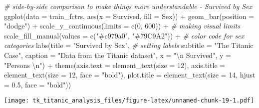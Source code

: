 \documentclass[
]{article}
\newenvironment{Shaded}{\begin{snugshade}}{\end{snugshade}}
\newcommand{\AttributeTok}[1]{\textcolor[rgb]{0.77,0.63,0.00}{#1}}
\newcommand{\CommentTok}[1]{\textcolor[rgb]{0.56,0.35,0.01}{\textit{#1}}}
\newcommand{\DecValTok}[1]{\textcolor[rgb]{0.00,0.00,0.81}{#1}}
\newcommand{\FloatTok}[1]{\textcolor[rgb]{0.00,0.00,0.81}{#1}}
\newcommand{\FunctionTok}[1]{\textcolor[rgb]{0.00,0.00,0.00}{#1}}
\newcommand{\NormalTok}[1]{#1}
\newcommand{\SpecialCharTok}[1]{\textcolor[rgb]{0.00,0.00,0.00}{#1}}
\newcommand{\StringTok}[1]{\textcolor[rgb]{0.31,0.60,0.02}{#1}}
\begin{document}
\begin{Shaded}
\begin{Highlighting}[]
\CommentTok{\# side{-}by{-}side comparison to make things more understandable {-} Survived by Sex}
\FunctionTok{ggplot}\NormalTok{(}\AttributeTok{data =}\NormalTok{ train\_fctrs, }\FunctionTok{aes}\NormalTok{(}\AttributeTok{x =}\NormalTok{ Survived, }\AttributeTok{fill =}\NormalTok{ Sex)) }\SpecialCharTok{+} \FunctionTok{geom\_bar}\NormalTok{(}\AttributeTok{position =} \StringTok{"dodge"}\NormalTok{) }\SpecialCharTok{+} 
  \FunctionTok{scale\_y\_continuous}\NormalTok{(}\AttributeTok{limits =} \FunctionTok{c}\NormalTok{(}\DecValTok{0}\NormalTok{, }\DecValTok{600}\NormalTok{)) }\SpecialCharTok{+}                \CommentTok{\# making visual limits}
  \FunctionTok{scale\_fill\_manual}\NormalTok{(}\AttributeTok{values =} \FunctionTok{c}\NormalTok{(}\StringTok{"\#c979a0"}\NormalTok{, }\StringTok{"\#79C9A2"}\NormalTok{)) }\SpecialCharTok{+}   \CommentTok{\# color code for sex categories}
  \FunctionTok{labs}\NormalTok{(}\AttributeTok{title =} \StringTok{"Survived by Sex"}\NormalTok{,                         }\CommentTok{\# setting labels}
       \AttributeTok{subtitle =} \StringTok{"The Titanic Case"}\NormalTok{,}
       \AttributeTok{caption =} \StringTok{"Data from the Titanic dataset"}\NormalTok{, }
       \AttributeTok{x =} \StringTok{"}\SpecialCharTok{\textbackslash{}n}\StringTok{ Survived"}\NormalTok{, }\AttributeTok{y =} \StringTok{"Persons }\SpecialCharTok{\textbackslash{}n}\StringTok{"}\NormalTok{) }\SpecialCharTok{+} 
  \FunctionTok{theme}\NormalTok{(}\AttributeTok{axis.text =} \FunctionTok{element\_text}\NormalTok{(}\AttributeTok{size =} \DecValTok{12}\NormalTok{), }
        \AttributeTok{axis.title =} \FunctionTok{element\_text}\NormalTok{(}\AttributeTok{size =} \DecValTok{12}\NormalTok{, }\AttributeTok{face =} \StringTok{"bold"}\NormalTok{), }
        \AttributeTok{plot.title =} \FunctionTok{element\_text}\NormalTok{(}\AttributeTok{size =} \DecValTok{14}\NormalTok{, }\AttributeTok{hjust =} \FloatTok{0.5}\NormalTok{, }\AttributeTok{face =} \StringTok{"bold"}\NormalTok{))}
\end{Highlighting}
\end{Shaded}

\texttt{[image: tk\_titanic\_analysis\_files/figure-latex/unnamed-chunk-19-1.pdf]}
\end{document}

